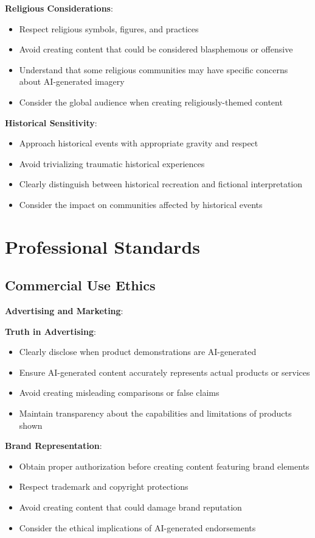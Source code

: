 \textbf{Religious Considerations}:
\begin{itemize}
\item Respect religious symbols, figures, and practices
\item Avoid creating content that could be considered blasphemous or offensive
\item Understand that some religious communities may have specific concerns about AI-generated imagery
\item Consider the global audience when creating religiously-themed content
\end{itemize}

\textbf{Historical Sensitivity}:
\begin{itemize}
\item Approach historical events with appropriate gravity and respect
\item Avoid trivializing traumatic historical experiences
\item Clearly distinguish between historical recreation and fictional interpretation
\item Consider the impact on communities affected by historical events
\end{itemize}

\section{Professional Standards}

\subsection{Commercial Use Ethics}
\textbf{Advertising and Marketing}:

\textbf{Truth in Advertising}:
\begin{itemize}
\item Clearly disclose when product demonstrations are AI-generated
\item Ensure AI-generated content accurately represents actual products or services
\item Avoid creating misleading comparisons or false claims
\item Maintain transparency about the capabilities and limitations of products shown
\end{itemize}

\textbf{Brand Representation}:
\begin{itemize}
\item Obtain proper authorization before creating content featuring brand elements
\item Respect trademark and copyright protections
\item Avoid creating content that could damage brand reputation
\item Consider the ethical implications of AI-generated endorsements
\end{itemize}

